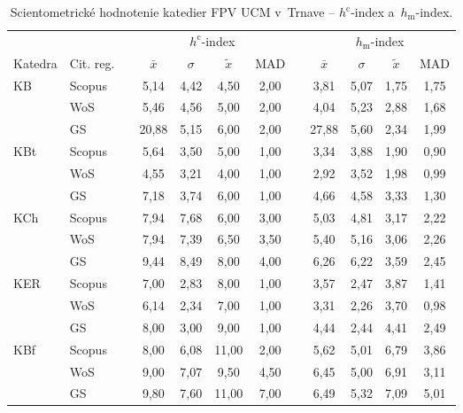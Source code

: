 \begin{table}
  \centering\small
  \caption[Hodnotenie FPV -- $h^{\mathrm{c}}$-index a $h_{\mathrm{m}}$-index]%
  {Scientometrické hodnotenie katedier FPV UCM v~Trnave -- $h^{\mathrm{c}}$-index a~$h_{\mathrm{m}}$-index.}
  \label{tab:6-staff.results}
  \begin{tabularx}{\textwidth}{XXp{1ex}ccccp{1ex}cccc}
    \toprule
    & & & \multicolumn{4}{c}{$h^{\mathrm{c}}$-index} & & \multicolumn{4}{c}{$h_{\mathrm{m}}$-index} \\
    \cmidrule{4-7}\cmidrule{9-12}
    Katedra & Cit. reg. & & $\bar{x}$ & $\sigma$ & $\tilde{x}$ & MAD & & $\bar{x}$ & $\sigma$ & $\tilde{x}$ & MAD \\
    \midrule
    KB   & Scopus & & 5,14  & 4,42 & 4,50  & 2,00 & & 3,81  & 5,07 & 1,75 & 1,75 \\
         & WoS    & & 5,46  & 4,56 & 5,00  & 2,00 & & 4,04  & 5,23 & 2,88 & 1,68 \\
         & GS     & & 20,88 & 5,15 & 6,00  & 2,00 & & 27,88 & 5,60 & 2,34 & 1,99 \\[1ex]
    KBt  & Scopus & & 5,64  & 3,50 & 5,00  & 1,00 & & 3,34  & 3,88 & 1,90 & 0,90 \\
         & WoS    & & 4,55  & 3,21 & 4,00  & 1,00 & & 2,92  & 3,52 & 1,98 & 0,99 \\
         & GS     & & 7,18  & 3,74 & 6,00  & 1,00 & & 4,66  & 4,58 & 3,33 & 1,30 \\[1ex]
    KCh  & Scopus & & 7,94  & 7,68 & 6,00  & 3,00 & & 5,03  & 4,81 & 3,17 & 2,22 \\
         & WoS    & & 7,94  & 7,39 & 6,50  & 3,50 & & 5,40  & 5,16 & 3,06 & 2,26 \\
         & GS     & & 9,44  & 8,49 & 8,00  & 4,00 & & 6,26  & 6,22 & 3,59 & 2,45 \\[1ex]
    KER  & Scopus & & 7,00  & 2,83 & 8,00  & 1,00 & & 3,57  & 2,47 & 3,87 & 1,41 \\
         & WoS    & & 6,14  & 2,34 & 7,00  & 1,00 & & 3,31  & 2,26 & 3,70 & 0,98 \\
         & GS     & & 8,00  & 3,00 & 9,00  & 1,00 & & 4,44  & 2,44 & 4,41 & 2,49 \\[1ex]
    KBf  & Scopus & & 8,00  & 6,08 & 11,00 & 2,00 & & 5,62  & 5,01 & 6,79 & 3,86 \\
         & WoS    & & 9,00  & 7,07 & 9,50  & 4,50 & & 6,45  & 5,00 & 6,91 & 3,11 \\
         & GS     & & 9,80  & 7,60 & 11,00 & 7,00 & & 6,49  & 5,32 & 7,09 & 5,01 \\[1ex]

\end{tabularx}
\end{table}
